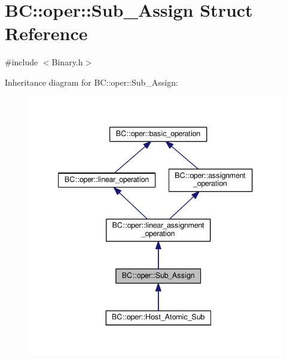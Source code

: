 \hypertarget{structBC_1_1oper_1_1Sub__Assign}{}\section{BC\+:\+:oper\+:\+:Sub\+\_\+\+Assign Struct Reference}
\label{structBC_1_1oper_1_1Sub__Assign}


{\ttfamily \#include $<$Binary.\+h$>$}



Inheritance diagram for BC\+:\+:oper\+:\+:Sub\+\_\+\+Assign\+:
\nopagebreak
\begin{figure}[H]
\begin{center}
\leavevmode
\includegraphics[width=340pt]{structBC_1_1oper_1_1Sub__Assign__inherit__graph}
\end{center}
\end{figure}


